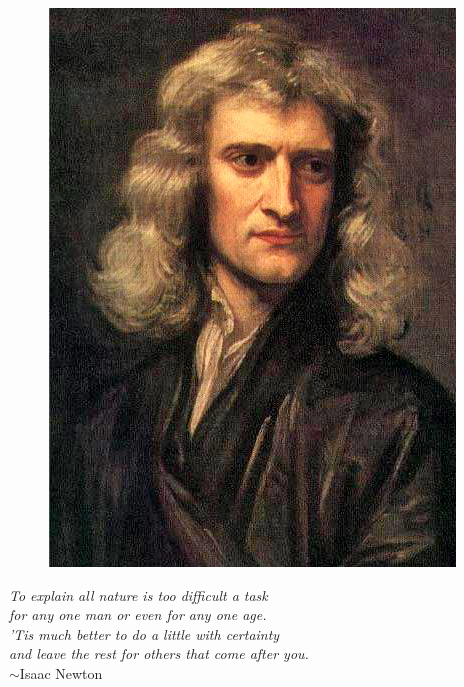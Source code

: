 \documentclass[12pt]{article}
\theoremstyle{definition}
\begin{document}
\setcounter{tocdepth}{1}



\begin{figure}[H]
    \centering \includegraphics[scale=.9]{newton.jpg}
\end{figure}

\begin{center}
    \textit{To explain all nature is too difficult a task\\
    for any one man or even for any one age.\\
    'Tis much better to do a little with certainty\\
    and leave the rest for others that come after you.}\\
    	$\sim$Isaac Newton
\end{center}

\newpage
\begin{spacing}{1}
\tableofcontents
\end{spacing}
\end{document}
